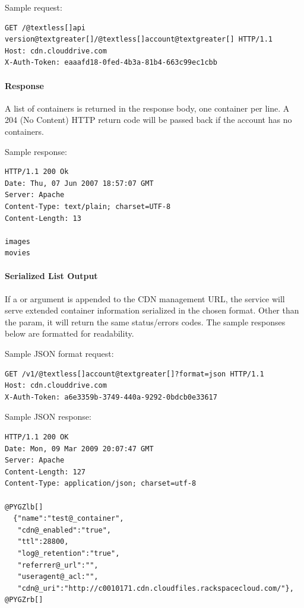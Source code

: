 \documentclass[letterpaper,10pt,english]{manual}
\begin{document}
Sample request:

\begin{Verbatim}[commandchars=@\[\]]
GET /@textless[]api version@textgreater[]/@textless[]account@textgreater[] HTTP/1.1
Host: cdn.clouddrive.com
X-Auth-Token: eaaafd18-0fed-4b3a-81b4-663c99ec1cbb
\end{Verbatim}


\paragraph{Response}

A list of containers is returned in the response body, one container per
line. A 204 (No Content) HTTP return code will be passed back if the
account has no containers.

Sample response:

\begin{Verbatim}[commandchars=@\[\]]
HTTP/1.1 200 Ok
Date: Thu, 07 Jun 2007 18:57:07 GMT
Server: Apache
Content-Type: text/plain; charset=UTF-8
Content-Length: 13

images
movies
\end{Verbatim}


\paragraph{Serialized List Output}

If a  or  argument is appended to the CDN
management URL, the service will serve extended container information
serialized in the chosen format.  Other than the 
param, it will return the same status/errors codes.  The sample responses
below are formatted for readability.

Sample JSON format request:

\begin{Verbatim}[commandchars=@\[\]]
GET /v1/@textless[]account@textgreater[]?format=json HTTP/1.1
Host: cdn.clouddrive.com
X-Auth-Token: a6e3359b-3749-440a-9292-0bdcb0e33617
\end{Verbatim}

Sample JSON response:

\begin{Verbatim}[commandchars=@\[\]]
HTTP/1.1 200 OK
Date: Mon, 09 Mar 2009 20:07:47 GMT
Server: Apache
Content-Length: 127
Content-Type: application/json; charset=utf-8

@PYGZlb[]
  {"name":"test@_container",
   "cdn@_enabled":"true",
   "ttl":28800,
   "log@_retention":"true",
   "referrer@_url":"",
   "useragent@_acl:"",
   "cdn@_uri":"http://c0010171.cdn.cloudfiles.rackspacecloud.com/"},
@PYGZrb[]
\end{Verbatim}
\end{document}
